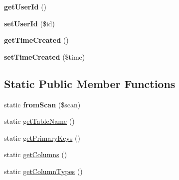 \begin{DoxyCompactItemize}
\item 
\hypertarget{classAnnotation_a3c3d63661ec1ebdedbc94fb197eadb2c}{
{\bfseries getUserId} ()}
\label{classAnnotation_a3c3d63661ec1ebdedbc94fb197eadb2c}

\item 
\hypertarget{classAnnotation_a1271e47971820ac05c06f80efc123d7e}{
{\bfseries setUserId} (\$id)}
\label{classAnnotation_a1271e47971820ac05c06f80efc123d7e}

\item 
\hypertarget{classAnnotation_a8beb591870b873673e92154685398dd6}{
{\bfseries getTimeCreated} ()}
\label{classAnnotation_a8beb591870b873673e92154685398dd6}

\item 
\hypertarget{classAnnotation_a66a16fef4dfff9362abc50df87d6aa85}{
{\bfseries setTimeCreated} (\$time)}
\label{classAnnotation_a66a16fef4dfff9362abc50df87d6aa85}

\end{DoxyCompactItemize}
\subsection*{Static Public Member Functions}
\begin{DoxyCompactItemize}
\item 
\hypertarget{classAnnotation_a7c5fdcc3bcb0502df6512a6613507458}{
static {\bfseries fromScan} (\$scan)}
\label{classAnnotation_a7c5fdcc3bcb0502df6512a6613507458}

\item 
static \hyperlink{classAnnotation_a9bc4933ab99e52e31b622a9829edd4bb}{getTableName} ()
\item 
static \hyperlink{classAnnotation_a8676c5ad1cf917a17cc70bb8c816437c}{getPrimaryKeys} ()
\item 
static \hyperlink{classAnnotation_a9e9b41c456e409ae6223258c4ba1fb94}{getColumns} ()
\item 
static \hyperlink{classAnnotation_a0081ac8f6cf11cce9ca0e6e4ed5d9ffc}{getColumnTypes} ()
\end{DoxyCompactItemize}
